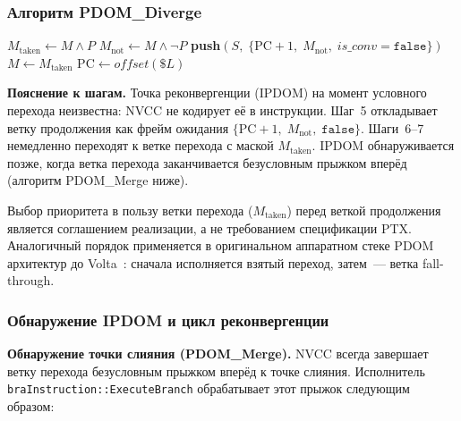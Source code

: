 \subsubsection{Алгоритм PDOM\_Diverge}

\begin{algorithm}[H]
  \caption{PDOM\_Diverge($M$, $P$, $\$L$) --- условный переход \texttt{@\%pN bra \$L}~\cite{Fung2007}}
  \label{alg:pdom_diverge}

  $M_{\mathrm{taken}} \leftarrow M \wedge P$\;
  $M_{\mathrm{not}} \leftarrow M \wedge \neg P$\;
  \textbf{push}$(S,\;\{\mathrm{PC}+1,\; M_{\mathrm{not}},\; \mathit{is\_conv} = \texttt{false}\})$\;
  $M \leftarrow M_{\mathrm{taken}}$\;
  $\mathrm{PC} \leftarrow \mathit{offset}(\$L)$\;
\end{algorithm}

\textbf{Пояснение к шагам.}
Точка реконвергенции (IPDOM) на момент условного перехода неизвестна:
NVCC не кодирует её в инструкции.
Шаг~5 откладывает ветку продолжения как фрейм ожидания
$\{\mathrm{PC}+1,\;M_{\mathrm{not}},\;\texttt{false}\}$.
Шаги~6--7 немедленно переходят к ветке перехода с маской $M_{\mathrm{taken}}$.
IPDOM обнаруживается позже, когда ветка перехода заканчивается
безусловным прыжком вперёд (алгоритм PDOM\_Merge ниже).

Выбор приоритета в пользу ветки перехода ($M_{\mathrm{taken}}$) перед веткой
продолжения является соглашением реализации, а не требованием
спецификации PTX. Аналогичный порядок применяется в оригинальном
аппаратном стеке PDOM архитектур до Volta~\cite{Lindholm2008, Narasiman2011, VoltaWhitepaper}:
сначала исполняется взятый переход, затем~--- ветка fall-through.

\subsubsection{Обнаружение IPDOM и цикл реконвергенции}

\begin{sloppypar}
\textbf{Обнаружение точки слияния (PDOM\_Merge).}
NVCC всегда завершает ветку перехода безусловным прыжком вперёд к точке
слияния. Исполнитель \texttt{braInstruction::ExecuteBranch} обрабатывает
этот прыжок следующим образом:
\end{sloppypar}


